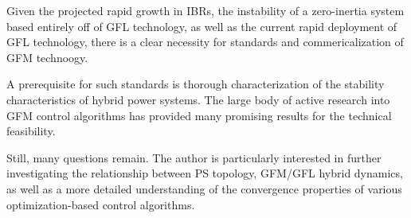 Given the projected rapid growth in IBRs, the instability of a
zero-inertia system based entirely off of GFL technology, as well
as the current rapid deployment of GFL technology, there is a clear
necessity for standards and commericalization of GFM technoogy.

A prerequisite for such standards is thorough characterization
of the stability characteristics of hybrid power systems. The
large body of active research into GFM control algorithms
has provided many promising results for the technical feasibility.

Still, many questions remain. The author is particularly interested
in further investigating the relationship between PS topology, GFM/GFL
hybrid dynamics, as well as a more detailed understanding of the
convergence properties of various optimization-based control algorithms.
